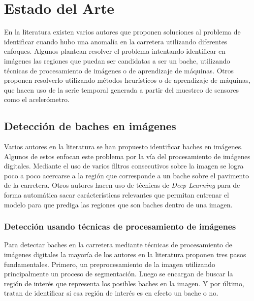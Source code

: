 \chapter{Estado del Arte}\label{chapter:state-of-the-art}
En la literatura existen varios autores que proponen soluciones al problema de identificar cuando hubo una anomalía en la carretera utilizando
diferentes enfoques. Algunos plantean resolver el problema intentando identificar en imágenes las regiones que puedan ser candidatas a ser un 
bache, utilizando  técnicas de procesamiento de imágenes o de aprendizaje de máquinas. Otros proponen resolverlo utilizando métodos heurísticos
o de aprendizaje de máquinas, que hacen uso de la serie temporal generada a partir del muestreo de sensores como el acelerómetro. 

\section{Detección de baches en imágenes}
Varios autores en la literatura se han propuesto identificar baches en imágenes. Algunos de estos enfocan este problema por la vía del
procesamiento de imágenes digitales. Mediante el uso de varios filtros consecutivos  sobre la imagen se logra poco a poco acercarse 
a la región que corresponde a un bache sobre el pavimento de la carretera.  Otros autores hacen uso de técnicas de \emph{Deep Learning}
para de forma automática sacar carácterísticas relevantes que permitan entrenar el modelo para que prediga las regiones 
que son baches dentro de una imagen.



	\subsection{Detección usando técnicas de procesamiento de imágenes}

		Para detectar baches en la carretera mediante técnicas de procesamiento de imágenes digitales la mayoría de los autores  en la literatura 
		proponen tres pasos fundamentales. Primero, un preprocesamiento de la imagen utilizando principalmente un proceso de segmentación. Luego 
		se encargan de buscar la región de interés que representa los posibles baches en la imagen. Y por último, tratan de identificar si esa 
		región de interés es en efecto un bache o no. 
		
